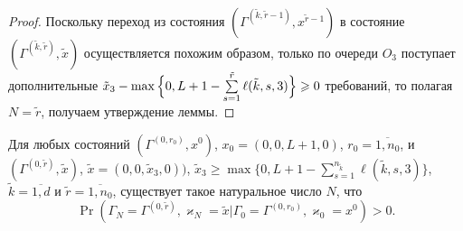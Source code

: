 \documentclass[a4paper,12pt,russian]{extarticle}
\begin{document}
\begin{proof}
Поскольку переход из состояния $(\Gamma^{(\tilde{k},\tilde{r}-1)}, x^{\tilde{r}-1})$ в состояние  $(\Gamma^{(\tilde{k},\tilde{r})}, \tilde{x})$ осуществляется похожим образом, только по очереди $O_3$ поступает дополнительные $\tilde{x}_3 \hm- \max{\Bigl\{0,L+1-\sum\limits_{s=1}^{\tilde{r}} \ell(\tilde{k},s,3)\Bigr\}}\geqslant 0$ требований, то полагая $N=\tilde{r}$, получаем утверждение леммы.
\end{proof}


\begin{lemma}
Для любых состояний $(\Gamma^{(0,r_0)},x^0)$, $x_0=(0,0,L+1,0)$, $r_0=\overline{1,n_0}$, и
$(\Gamma^{(0,\tilde{r})},\tilde{x})$,
$\tilde{x}=(0,0,\tilde{x}_3,0))$, $\tilde{x}_3 \geqslant \max{\{0,L+1-\sum_{s=1}^{n_{\tilde{k}}} \ell(\tilde{k},s,3)\}}$,
$\tilde{k}=\overline{1,d}$ и $\tilde{r} = \overline{1,n_0}$, существует такое натуральное число $N$, что 
\begin{equation*}
\Pr(\Gamma_{N}=\Gamma^{(0,\tilde{r} )}, \varkappa_{N}=\tilde{x}|
\Gamma_{0}=\Gamma^{(0,r_0)}, \varkappa_{0}=x^0)>0.
\end{equation*}
\end{lemma}
\end{document}
